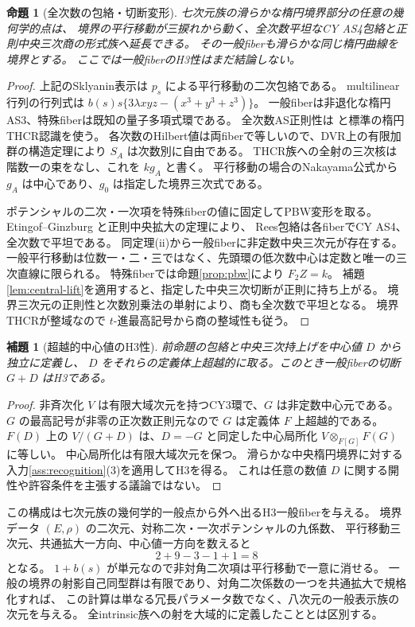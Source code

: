\documentclass[11pt,a4paper]{ltjsarticle}
\newtheorem{proposition}[theorem]{命題}
\newtheorem{lemma}[theorem]{補題}
\theoremstyle{definition}\newtheorem{definition}[theorem]{定義}
\theoremstyle{remark}\newtheorem{remark}[theorem]{注意}
\begin{document}
\begin{proposition}[全次数の包絡・切断変形]\label{prop:formal-integral}
七次元族の滑らかな楕円境界部分の任意の幾何学的点は、
境界の平行移動が三捩れから動く、全次数平坦なCY AS4包絡と正則中央三次商の形式族へ延長できる。
その一般fiberも滑らかな同じ楕円曲線を境界とする。
ここでは一般fiberのH3性はまだ結論しない。
\end{proposition}
\begin{proof}
上記のSklyanin表示は $p_s$ による平行移動の二次包絡である。
multilinear行列の行列式は
$b(s)s\{3\lambda xyz-(x^3+y^3+z^3)\}$。
一般fiberは非退化な楕円AS3、特殊fiberは既知の量子多項式環である。
全次数AS正則性は \cite{IS} と標準の楕円THCR認識を使う。
各次数のHilbert値は両fiberで等しいので、DVR上の有限加群の構造定理により $S_A$ は次数別に自由である。
THCR族への全射の三次核は階数一の束をなし、これを $kg_A$ と書く。
平行移動の場合のNakayama公式から $g_A$ は中心であり、$g_0$ は指定した境界三次式である。

ポテンシャルの二次・一次項を特殊fiberの値に固定してPBW変形を取る。
Etingof--Ginzburg \cite[Theorem 3.3.2(i)]{EG} と正則中央拡大の定理により、
Rees包絡は各fiberでCY AS4、全次数で平坦である。
同定理(ii)から一般fiberに非定数中央三次元が存在する。
一般平行移動は位数一・二・三ではなく、先頭環の低次数中心は定数と唯一の三次直線に限られる。
特殊fiberでは命題\ref{prop:pbw}により $F_2Z=k$。
補題\ref{lem:central-lift}を適用すると、指定した中央三次切断が正則に持ち上がる。
境界三次元の正則性と次数別乗法の単射により、商も全次数で平坦となる。
境界THCRが整域なので $t$-進最高記号から商の整域性も従う。
\end{proof}

\begin{lemma}[超越的中心値のH3性]\label{lem:generic-D}
前命題の包絡と中央三次持上げを中心値 $D$ から独立に定義し、
$D$ をそれらの定義体上超越的に取る。このとき一般fiberの切断 $G+D$ はH3である。
\end{lemma}
\begin{proof}
非斉次化 $V$ は有限大域次元を持つCY3環で、$G$ は非定数中心元である。
$G$ の最高記号が非零の正次数正則元なので $G$ は定義体 $F$ 上超越的である。
$F(D)$ 上の $V/(G+D)$ は、$D=-G$ と同定した中心局所化
$V\otimes_{F[G]}F(G)$ に等しい。
中心局所化は有限大域次元を保つ。
滑らかな中央楕円境界に対する入力\ref{ass:recognition}(3)を適用してH3を得る。
これは任意の数値 $D$ に関する開性や許容条件を主張する議論ではない。
\end{proof}

この構成は七次元族の幾何学的一般点から外へ出るH3一般fiberを与える。
境界データ $(E,\rho)$ の二次元、対称二次・一次ポテンシャルの九係数、
平行移動三次元、共通拡大一方向、中心値一方向を数えると
\[
2+9-3-1+1=8
\]
となる。
$1+b(s)$ が単元なので非対角二次項は平行移動で一意に消せる。
一般の境界の射影自己同型群は有限であり、対角二次係数の一つを共通拡大で規格化すれば、
この計算は単なる冗長パラメータ数でなく、八次元の一般表示族の次元を与える。
全intrinsic族への射を大域的に定義したこととは区別する。
\end{document}
